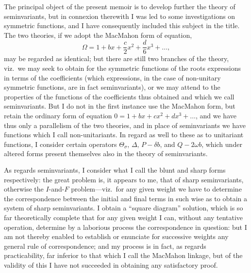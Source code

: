 \documentclass[11pt]{article}
\begin{document}
The principal object of the present memoir is to develop further the theory of seminvariants, but in connexion therewith I was led to some investigations on symmetric functions, and I have consequently included this subject in the title. The two theories, if we adopt the MacMahon form of equation,
\[
\Omega = 1 + bx + \frac{c}{2}x^2 + \frac{d}{6}x^3 + \ldots,
\]
may be regarded as identical; but there are still two branches of the theory, viz.\ we may seek to obtain for the symmetric functions of the roots expressions in terms of the coefficients (which expressions, in the case of non-unitary symmetric functions, are in fact seminvariants), or we may attend to the properties of the functions of the coefficients thus obtained and which we call seminvariants. But I do not in the first instance use the MacMahon form, but retain the ordinary form of equation $0 = 1 + bx + cx^2 + dx^3 + \ldots$, and we have thus only a parallelism of the two theories, and in place of seminvariants we have functions which I call non-unitariants. In regard as well to these as to unitariant functions, I consider certain operators $\Theta_\sigma$, $\Delta$, $P - \delta b$, and $Q - 2\omega b$, which under altered forms present themselves also in the theory of seminvariants.

As regards seminvariants, I consider what I call the blunt and sharp forms respectively: the great problem is, it appears to me, that of sharp seminvariants, otherwise the $I$-and-$F$ problem---viz.\ for any given weight we have to determine the correspondence between the initial and final terms in such wise as to obtain a system of sharp seminvariants. I obtain a ``square diagram'' solution, which is so far theoretically complete that for any given weight I can, without any tentative operation, determine by a laborious process the correspondence in question: but I am not thereby enabled to establish or enunciate for successive weights any general rule of correspondence; and my process is in fact, as regards practicability, far inferior to that which I call the MacMahon linkage, but of the validity of this I have not succeeded in obtaining any satisfactory proof.
\end{document}
